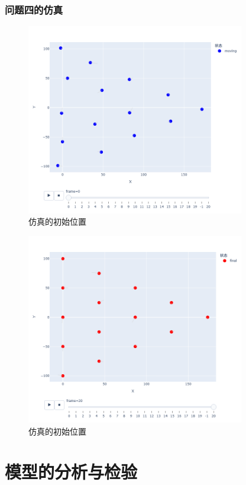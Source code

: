 \documentclass[withoutpreface,bwprint]{cumcmthesis} %
\begin{document}
\subsubsection{问题四的仿真}
\begin{figure}[H]
    \centering
    \includegraphics[width=0.85\textwidth]{../../figure/start_4.png} 
    \caption{仿真的初始位置}
    \label{q4_2}    
\end{figure}
\begin{figure}[H]
    \centering
    \includegraphics[width=0.85\textwidth]{../../figure/end_4.png} 
    \caption{仿真的初始位置}
    \label{q4_2}    
\end{figure}


\section{模型的分析与检验}
\end{document}
